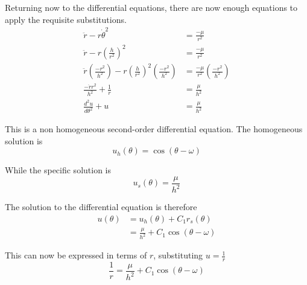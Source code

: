\documentclass[../basicOrbitalDynamics.tex]{subfiles}
\begin{document}
Returning now to the differential equations, there are now enough equations to apply the requisite substitutions.
\begin{align*}
    \ddot{r}-r\dot{\theta}^2                                        & =\frac{-\mu}{r^2}                   \\
    \ddot{r}-r(\frac{h}{r^2})^2                                     & =\frac{-\mu}{r^2}                   \\
    \ddot{r}(\frac{-r^2}{h^2})-r(\frac{h}{r^2})^2(\frac{-r^2}{h^2}) & =\frac{-\mu}{r^2}(\frac{-r^2}{h^2}) \\
    \frac{-\ddot{r}r^2}{h^2}+\frac{1}{r}                            & =\frac{\mu}{h^2}                    \\
    \frac{d^2u}{d\theta^2}+u                                        & =\frac{\mu}{h^2}
\end{align*}

This is a non homogeneous second-order differential equation. The homogeneous solution is
$$u_h(\theta)=\cos(\theta-\omega)$$

While the specific solution is
$$u_s(\theta)=\frac{\mu}{h^2}$$

The solution to the differential equation is therefore
\begin{align*}
    u(\theta) & =u_h(\theta)+C_1r_s(\theta)             \\
              & =\frac{\mu}{h^2}+C_1\cos(\theta-\omega)
\end{align*}

This can now be expressed in terms of $r$, substituting $u=\frac{1}{r}$
\begin{equation}\label{1/r in terms of theta}
    \frac{1}{r}=\frac{\mu}{h^2}+C_1\cos(\theta-\omega)
\end{equation}
\end{document}
